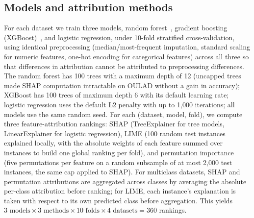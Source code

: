 \documentclass[11pt,twoside,a4paper]{article}
\begin{document}
\subsection{Models and attribution methods}
For each dataset we train three models, random forest~\citep{breiman2001random}, gradient boosting (XGBoost)~\citep{chen2016xgboost}, and logistic regression, under 10-fold stratified cross-validation, using identical preprocessing (median/most-frequent imputation, standard scaling for numeric features, one-hot encoding for categorical features) across all three so that differences in attribution cannot be attributed to preprocessing differences. The random forest has 100 trees with a maximum depth of 12 (uncapped trees made SHAP computation intractable on OULAD without a gain in accuracy); XGBoost has 100 trees of maximum depth 6 with its default learning rate; logistic regression uses the default L2 penalty with up to 1{,}000 iterations; all models use the same random seed. For each (dataset, model, fold), we compute three feature-attribution rankings: SHAP (TreeExplainer for tree models, LinearExplainer for logistic regression), LIME (100 random test instances explained locally, with the absolute weights of each feature summed over instances to build one global ranking per fold), and permutation importance~\citep{fisher2019models} (five permutations per feature on a random subsample of at most 2{,}000 test instances, the same cap applied to SHAP). For multiclass datasets, SHAP and permutation attributions are aggregated across classes by averaging the absolute per-class attribution before ranking; for LIME, each instance's explanation is taken with respect to its own predicted class before aggregation. This yields $3 \text{ models} \times 3 \text{ methods} \times 10 \text{ folds} \times 4 \text{ datasets} = 360$ rankings.
\end{document}

